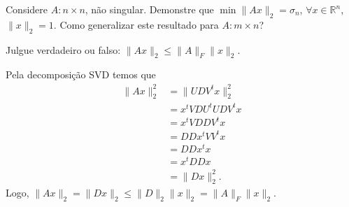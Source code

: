 \documentclass[a4paper,12pt, leqno, answers]{exam}
\begin{document}
\begin{questions}
    \question Considere $A : n \times n$, n\~{a}o singular. Demonstre que $\min \| A x \|_2 = \sigma_n$, $\forall x \in \mathbb{R}^n$, $\| x \|_2 = 1$. Como generalizar este resultado para $A : m \times n$?
    \begin{solution}
    \end{solution}

    \question Julgue verdadeiro ou falso: $\| A x \|_2 \leq \| A \|_F \| x \|_2$.
    \begin{solution}
        Pela decomposi\c{c}\~{a}o SVD temos que
        \begin{align*}
            \| A x \|_2^2 &= \| U D V^t x \|_2^2 \\
            &= x^t V D U^t U D V^t x \\
            &= x^t V D D V^t x \\
            &= D D x^t V V^t x \\
            &= D D x^t x \\
            &= x^t D D x \\
            &= \| D x \|_2^2.
        \end{align*}
        Logo, $\| A x \|_2 = \| D x \|_2 \leq \| D \|_2 \| x \|_2 = \| A \|_F \| x \|_2$.
    \end{solution}
\end{questions}


\end{document}
